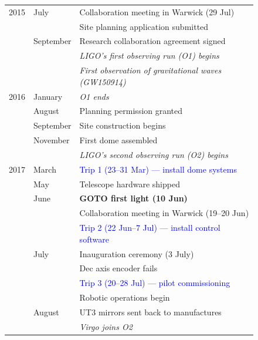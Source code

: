 \begin{colsection}
\begin{figure}[p]
    \begin{center}
        \begin{tabular}{cl|@{\tls}l} %
            2015 & July      & Collaboration meeting in Warwick (29 Jul) \\
                 &           & Site planning application submitted \\
                 & September & Research collaboration agreement signed \\
                 &           & \textit{LIGO's first observing run (O1) begins} \\
                 &           & \textit{First observation of gravitational waves (GW150914)} \\
            \midrule
            2016 & January   & \textit{O1 ends} \\
                 & August    & Planning permission granted \\
                 & September & Site construction begins \\
                 & November  & First dome assembled \\
                 &           & \textit{LIGO's second observing run (O2) begins} \\
            \midrule
            2017 & March     & \textcolor{Blue}{Trip 1 (23--31 Mar) --- install dome systems} \\
                 & May       & Telescope hardware shipped \\
                 & June      & \textbf{GOTO first light (10 Jun)} \\
                 &           & Collaboration meeting in Warwick (19--20 Jun) \\
                 &           & \textcolor{Blue}{Trip 2 (22 Jun--7 Jul) --- install control software} \\
                 & July      & Inauguration ceremony (3 July) \\
                 &           & Dec axis encoder fails \\
                 &           & \textcolor{Blue}{Trip 3 (20--28 Jul) --- pilot commissioning} \\
                 &           & Robotic operations begin \\
                 & August    & UT3 mirrors sent back to manufactures \\
                 &           & \textit{Virgo joins O2} \\

\end{tabular}
\end{center}
\end{figure}
\end{colsection}
